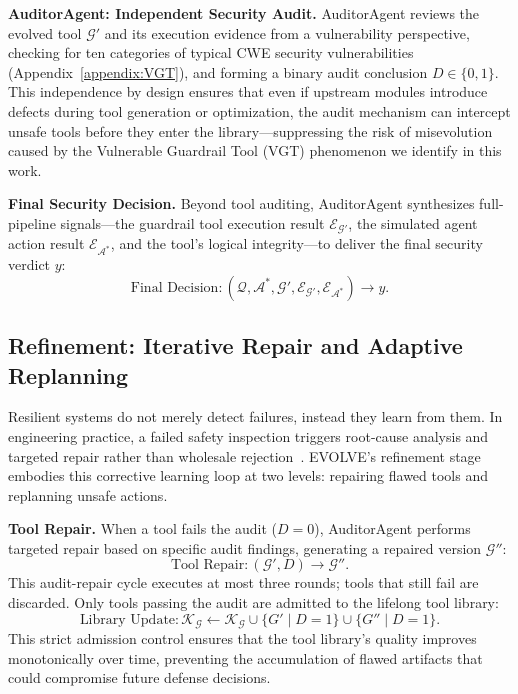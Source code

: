   \noindent\textbf{AuditorAgent: Independent Security Audit.} AuditorAgent reviews the evolved tool $\mathcal{G}'$ and its execution evidence from a vulnerability perspective, checking for ten categories of typical CWE
  security vulnerabilities (Appendix~\ref{appendix:VGT}), and forming a binary audit conclusion $D \in \{0, 1\}$. This independence by design ensures that even if upstream modules introduce defects during tool generation
   or optimization, the audit mechanism can intercept unsafe tools before they enter the library---suppressing the risk of misevolution caused by the Vulnerable Guardrail Tool (VGT) phenomenon we identify in this work.

  \noindent\textbf{Final Security Decision.} Beyond tool auditing, AuditorAgent synthesizes full-pipeline signals---the guardrail tool execution result $\mathcal{E}_{\mathcal{G}'}$, the simulated agent action result
  $\mathcal{E}_{\mathcal{A}^*}$, and the tool's logical integrity---to deliver the final security verdict $y$:
  \begin{equation}
      \text{Final Decision} : \left( \mathcal{Q}, \mathcal{A}^*, \mathcal{G}', \mathcal{E}_{\mathcal{G}'}, \mathcal{E}_{\mathcal{A}^*} \right) \rightarrow y.
  \end{equation}


  \subsection{Refinement: Iterative Repair and Adaptive Replanning}

  Resilient systems do not merely detect failures, instead they learn from them. In engineering practice, a failed safety inspection triggers root-cause analysis and targeted repair rather than wholesale
  rejection~\citep{argyris1997organizational}. EVOLVE's refinement stage embodies this corrective learning loop at two levels: repairing flawed tools and replanning unsafe actions.

  \noindent\textbf{Tool Repair.} When a tool fails the audit ($D = 0$), AuditorAgent performs targeted repair based on specific audit findings, generating a repaired version $\mathcal{G}''$:
  \begin{equation}
      \text{Tool Repair} : (\mathcal{G}', D) \rightarrow \mathcal{G}''.
  \end{equation}
  This audit-repair cycle executes at most three rounds; tools that still fail are discarded. Only tools passing the audit are admitted to the lifelong tool library:
  \begin{equation}
      \text{Library Update} : \mathcal{K}_{\mathcal{G}} \leftarrow \mathcal{K}_{\mathcal{G}} \cup \{G' \mid D = 1\} \cup \{G'' \mid D = 1\}.
  \end{equation}
  This strict admission control ensures that the tool library's quality improves monotonically over time, preventing the accumulation of flawed artifacts that could compromise future defense decisions.

